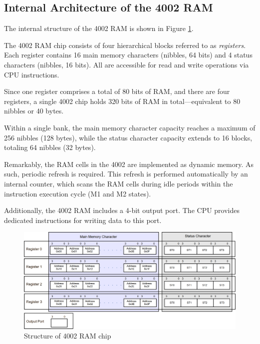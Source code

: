 \subsection{Internal Architecture of the 4002 RAM}
The internal structure of the 4002 RAM is shown in Figure \ref{fig:STRUCTURE4002}.

The 4002 RAM chip consists of four hierarchical blocks referred to as \textit{registers}. Each register contains 16 main memory characters (nibbles, 64 bits) and 4 status characters (nibbles, 16 bits). All are accessible for read and write operations via CPU instructions.

Since one register comprises a total of 80 bits of RAM, and there are four registers, a single 4002 chip holds 320 bits of RAM in total—equivalent to 80 nibbles or 40 bytes.

Within a single bank, the main memory character capacity reaches a maximum of 256 nibbles (128 bytes), while the status character capacity extends to 16 blocks, totaling 64 nibbles (32 bytes).

Remarkably, the RAM cells in the 4002 are implemented as dynamic memory. As such, periodic refresh is required. This refresh is performed automatically by an internal counter, which scans the RAM cells during idle periods within the instruction execution cycle (M1 and M2 states).

Additionally, the 4002 RAM includes a 4-bit output port. The CPU provides dedicated instructions for writing data to this port.

\begin{figure}
    \includegraphics[width=1.0\columnwidth]{./Figure/Structure4002.png}
    \caption{Structure of 4002 RAM chip}
    \label{fig:STRUCTURE4002}
\end{figure}

